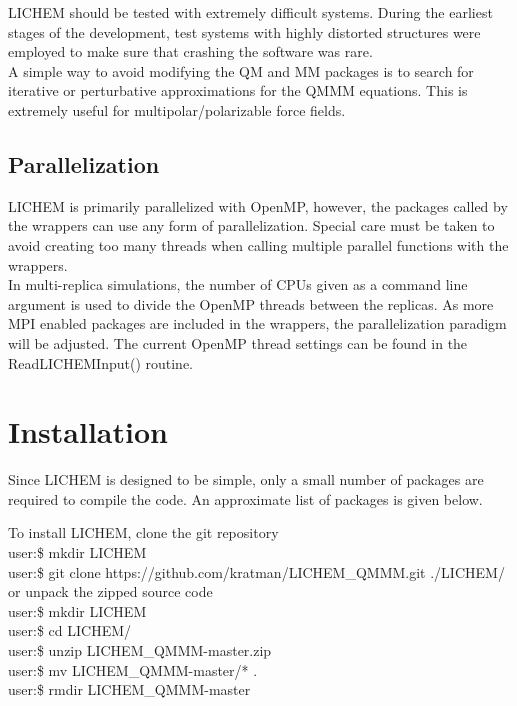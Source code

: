 \documentclass[12pt]{report}
\begin{document}
LICHEM should be tested with extremely difficult systems.
During the earliest stages of the development, test systems with highly
distorted structures were employed to make sure that crashing the software
was rare. \\

A simple way to avoid modifying the QM and MM packages is to search for
iterative or perturbative approximations for the QMMM equations.
This is extremely useful for multipolar/polarizable force fields.

\subsection{Parallelization}

LICHEM is primarily parallelized with OpenMP, however, the packages called by
the wrappers can use any form of parallelization.
Special care must be taken to avoid creating too many threads when calling
multiple parallel functions with the wrappers. \\

In multi-replica simulations, the number of CPUs given as a command line
argument is used to divide the OpenMP threads between the replicas.
As more MPI enabled packages are included in the wrappers, the parallelization
paradigm will be adjusted.
The current OpenMP thread settings can be found in the ReadLICHEMInput()
routine.

\section{Installation}

Since LICHEM is designed to be simple, only a small number of packages are
required to compile the code.
An approximate list of packages is given below.
\begin{quote}
\end{quote}

To install LICHEM, clone the git repository \\

user:\$ mkdir LICHEM \\
user:\$ git clone https://github.com/kratman/LICHEM\_QMMM.git ./LICHEM/ \\

or unpack the zipped source code \\

user:\$ mkdir LICHEM \\
user:\$ cd LICHEM/ \\
user:\$ unzip LICHEM\_QMMM-master.zip \\
user:\$ mv LICHEM\_QMMM-master/* . \\
user:\$ rmdir LICHEM\_QMMM-master \\
\end{document}
